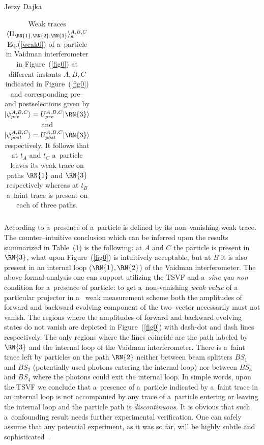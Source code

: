 \begin{artengenv}{Jerzy Dajka}
\begin{table}[ht]
\begin{tabular}{|l||lll|ll|}
\end{tabular}
\caption{\label{tab0} Weak traces $\langle\Pi_{\RN{1},\RN{2},\RN{3}}\rangle_w^{A,B,C}$ Eq.(\ref{weak0}) of a~particle in Vaidman interferometer in Figure~(\ref{fig0}) at different instants $A,B,C$ indicated in Figure~(\ref{fig0}) and corresponding pre-- and postselections given by $|\psi_{pre}^{A,B,C}\rangle=U_{pre}^{A,B,C}|\RN{3}\rangle$ and $|\psi_{post}^{A,B,C}\rangle=U_{post}^{A,B,C}|\RN{3}\rangle$ respectively. It follows that at $t_A$ and $t_C$ a~particle leaves its weak trace on paths $\RN{1}$ and $\RN{3}$ respectively whereas at $t_B$ a~faint trace is present on each of three paths.}
\end{table}
According to \parencite{PhysRevA.87.052104} a~presence of a~particle is defined by 
its non--vanishing weak trace. The counter--intuitive conclusion which can be inferred upon the results summarized in Table~(\ref{tab0}) is the following: at $A$ and $C$ the particle is present in $\RN{3}$, what upon Figure~(\ref{fig0}) is intuitively acceptable, but at $B$ it is also present in an internal loop ($\RN{1},\RN{2}$) of the Vaidman interferometer.  The above formal analysis one can support  utilizing the TSVF and a~{\it sine qua non} condition for a~presence of particle: to get a~non-vanishing  
{\it weak value} of a~ particular projector in a~ weak measurement scheme  both the amplitudes of  forward and backward evolving component of the two--vector  necessarily   must  not vanish.  The regions where the amplitudes of forward and backward evolving states do not vanish are depicted in Figure~(\ref{fig0}) with dash-dot and dash lines respectively. The only regions where the lines coincide are the path labeled by $\RN{3}$ and the internal loop of the Vaidman interferometer. There is a~faint trace left by  particles  on the path $\RN{2}$ neither between beam splitters $BS_1$ and $BS_2$ (potentially used  photons entering the internal loop) nor between $BS_3$ and $BS_4$ where the photons could exit the internal loop. In simple words, upon the TSVF we conclude that a~presence of a~particle indicated by a~faint trace  in an internal loop is not accompanied by any trace of a~particle entering or leaving the internal loop and the particle path is 
{\it discontinuous}.  It is obvious that such a~confounding result needs further experimental verification. One can safely assume that any potential experiment, as it was so far, will be highly subtle and sophisticated~\parencite{e20110854,PhysRevA.101.052119,pnas,pnas1}. 








\end{artengenv}
